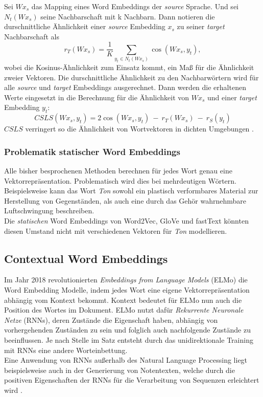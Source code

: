 \documentclass[ngerman]{ttlab-qualify}
\begin{document}
Sei \(Wx_s\) das Mapping eines Word Embeddings der \textit{source} Sprache. Und sei \(N_t(Wx_s)\) seine Nachbarschaft mit k Nachbarn. Dann notieren \textcite[vgl.][4]{conneau2017word} die durschnittliche Ähnlichkeit einer \textit{source} Embedding \(x_s\) zu seiner \textit{target} Nachbarschaft als 
\[r_T(Wx_s) = \frac{1}{K} \sum_{y_t\in{N_t}(Wx_s)} \cos(Wx_s,y_t),\]
wobei die Kosinus-Ähnlichkeit zum Einsatz kommt, ein Maß für die Ähnlichkeit zweier Vektoren. Die durschnittliche Ähnlichkeit zu den Nachbarwörtern wird für alle \textit{source} und \textit{target} Embeddings ausgerechnet. Dann werden die erhaltenen Werte eingesetzt in die Berechnung für die Ähnlichkeit von \(Wx_s\) und einer \textit{target} Embedding \(y_t\):
\[CSLS(Wx_s,y_t) = 2\cos(Wx_s,y_t)\ - \ r_T(Wx_s)\ - \ r_S(y_t)\]
$CSLS$ verringert so die Ähnlichkeit von Wortvektoren in dichten Umgebungen \parencite{conneau2017word}. 
\newpage
\subsubsection{Problematik statischer Word Embeddings} \label{Word_Embeddings_problematik}
Alle bisher besprochenen Methoden berechnen für jedes Wort genau eine Vektorrepräsentation. Problematisch wird dies bei mehrdeutigen Wörtern. Beispielsweise kann das Wort \textit{Ton} sowohl ein plastisch verformbares Material zur Herstellung von Gegenständen, als auch eine durch das Gehör wahrnehmbare Luftschwingung beschreiben.\\
Die \textit{statischen} Word Embeddings von Word2Vec, GloVe und fastText könnten diesen Umstand nicht mit verschiedenen Vektoren für \textit{Ton} modellieren.

\subsection{Contextual Word Embeddings}
Im Jahr 2018 revolutionierten \textit{Embeddings from Language Models} (ELMo) \parencite{ELMo} die Word Embedding Modelle, indem jedes Wort eine eigene Vektorrepräsentation abhängig vom Kontext bekommt. Kontext bedeutet für ELMo nun auch die Position des Wortes im Dokument. ELMo nutzt dafür \textit{Rekurrente Neuronale Netze} (RNNs), deren Zustände die Eigenschaft haben, abhängig von vorhergehenden Zuständen zu sein und folglich auch nachfolgende Zustände zu beeinflussen. Je nach Stelle im Satz entsteht durch das unidirektionale Training mit RNNs eine andere Worteinbettung.\\
Eine Anwendung von RNNs außerhalb des Natural Language Processing liegt beispielsweise auch in der Generierung von Notentexten, welche durch die positiven Eigenschaften der RNNs für die Verarbeitung von Sequenzen erleichtert wird \parencite{DUA2020465}.
\end{document}
